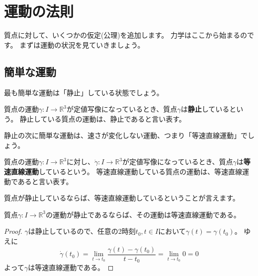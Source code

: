 \chapter{運動の法則}

質点に対して、いくつかの仮定(公理)を追加します。
力学はここから始まるのです。
まずは運動の状況を見ていきましょう。



\section{簡単な運動}

最も簡単な運動は「静止」している状態でしょう。
\begin{definition}
  質点の運動$\gamma:I\to\mathbb{R}^3$が定値写像になっているとき、質点$\gamma$は\textbf{静止}しているという。
  静止している質点の運動は、静止であると言い表す。
\end{definition}

静止の次に簡単な運動は、速さが変化しない運動、つまり「等速直線運動」でしょう。
\begin{definition}
  質点の運動$\gamma:I\to\mathbb{R}^3$に対し、$\dot\gamma:I\to\mathbb{R}^3$が定値写像になっているとき、質点$\gamma$は\textbf{等速直線運動}しているという。
  等速直線運動している質点の運動は、等速直線運動であると言い表す。
\end{definition}

質点が静止しているならば、等速直線運動しているということが言えます。
\begin{theorem}
  質点$\gamma:I\to\mathbb{R}^3$の運動が静止であるならば、その運動は等速直線運動である。
\end{theorem}
\begin{proof}
  $\gamma$は静止しているので、任意の2時刻$t_0,t\in I$において$\gamma(t)=\gamma(t_0)$。
  ゆえに
  \[
    \dot\gamma(t_0)=\lim_{t\to t_0}\frac{\gamma(t)-\gamma(t_0)}{t-t_0}=\lim_{t\to t_0}0=0
  \]
  よって$\gamma$は等速直線運動である。
\end{proof}

